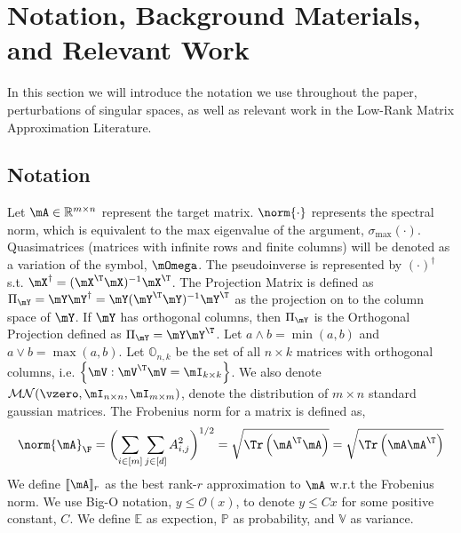 \documentclass[10pt]{article}
\theoremstyle{plain}
\theoremstyle{definition}
\theoremstyle{remark}
\begin{document}
\section{Notation, Background Materials, and Relevant Work}
In this section we will introduce the notation we use throughout the paper, perturbations of singular spaces, as well as relevant work in the Low-Rank Matrix Approximation Literature.
\subsection{Notation}
Let $\mA \in \mathbb{R}^{m \times n} $ represent the target matrix. $\norm{\cdot}$ represents the spectral norm, which is equivalent to the max eigenvalue of the argument, $\sigma_{\max}(\cdot)$. Quasimatrices (matrices with infinite rows and finite columns) will be denoted as a variation of the symbol, $\mOmega$. The pseudoinverse is represented by $(\cdot)^\dagger$ s.t. $\mX^\dagger = (\mX^{\T} \mX)^{-1} \mX^{\T}$. The Projection Matrix is defined as $\Pi_{\mY} = \mY\mY^{\dagger} = \mY (\mY^{\T}\mY)^{-1}\mY^{\T}$ as the projection on to the column space of $\mY$. If $\mY$ has orthogonal columns, then $\Pi_{\mY}$ is the Orthogonal Projection defined as $\Pi_{\mY} = \mY\mY^{\T}$. Let $a \land b = \min(a,b)$ and $a \lor b = \max(a,b)$. Let $\mathbb{O}_{n,k}$ be the set of all $n \times k$ matrices with orthogonal columns, i.e. $\left\{\mV: \mV^{\T}\mV = \mI_{k\times k}\right\}$. We also denote $\mathcal{MN}(\vzero, \mI_{n \times n}, \mI_{m \times m})$, denote the distribution of $m \times n$ standard gaussian matrices. The Frobenius norm for a matrix is defined as, 
\begin{equation}
	\norm{\mA}_{\F} = \biggl(\sum_{i \in [m]}\sum_{j\in [d]} A_{i,j}^2\biggr)^{1/2} = \sqrt{\Tr\left(\mA^{\T}\mA\right)} = \sqrt{\Tr\left(\mA\mA^{\T}\right)}
\end{equation}
We define $\llbracket \mA \rrbracket_r$ as the best rank-$r$ approximation to $\mA$ w.r.t the Frobenius norm. We use Big-O notation, $y \leq \mathcal{O}(x)$, to denote $ y \leq Cx$ for some positive constant, $C$. We define $\mathbb{E}$ as expection, $\mathbb{P}$ as probability, and $\mathbb{V}$ as variance. 
\end{document}
